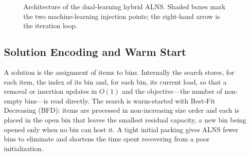 \documentclass[conference]{IEEEtran}
\begin{document}
\begin{figure}[t]
	\centering
	\caption{Architecture of the dual-learning hybrid ALNS. Shaded boxes mark the two
		machine-learning injection points; the right-hand arrow is the iteration loop.}
	\label{fig:arch}
\end{figure}

\subsection{Solution Encoding and Warm Start}
A solution is the assignment of items to bins. Internally the search stores, for
each item, the index of its bin and, for each bin, its current load, so that a
removal or insertion updates in $O(1)$ and the objective---the number of
non-empty bins---is read directly. The search is warm-started with Best-Fit
Decreasing (BFD): items are processed in non-increasing size order and each is
placed in the open bin that leaves the smallest residual capacity, a new bin being
opened only when no bin can host it. A tight initial packing gives ALNS fewer bins
to eliminate and shortens the time spent recovering from a poor initialization.
\end{document}
